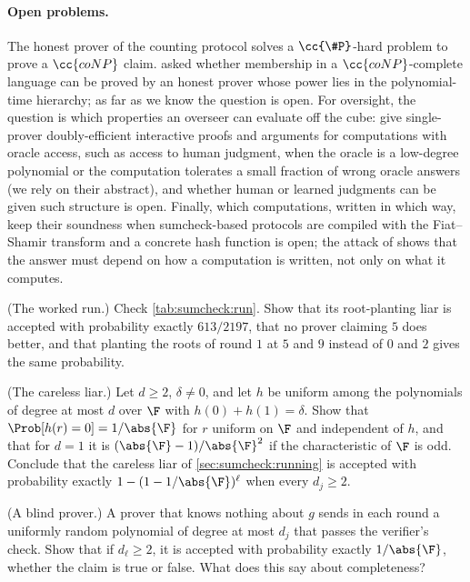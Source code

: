 \begin{refsection}
\paragraph{Open problems.} The honest prover of the counting protocol solves a $\cc{\#P}$-hard problem to prove a $\cc{coNP}$ claim. \Textcite{Babai1990} asked whether membership in a $\cc{coNP}$-complete language can be proved by an honest prover whose power lies in the polynomial-time hierarchy; as far as we know the question is open. For oversight, the question is which properties an overseer can evaluate off the cube: \textcite{ChenKalaiXi2026} give single-prover doubly-efficient interactive proofs and arguments for computations with oracle access, such as access to human judgment, when the oracle is a low-degree polynomial or the computation tolerates a small fraction of wrong oracle answers (we rely on their abstract), and whether human or learned judgments can be given such structure is open. Finally, which computations, written in which way, keep their soundness when sumcheck-based protocols are compiled with the Fiat--Shamir transform and a concrete hash function is open; the attack of \textcite{KhovratovichRothblumSoukhanov2025} shows that the answer must depend on how a computation is written, not only on what it computes.

\begin{exercises}
\item \consolidation (The worked run.) Check \cref{tab:sumcheck:run}. Show that its root-planting liar is accepted with probability exactly $613/2197$, that no prover claiming $5$ does better, and that planting the roots of round $1$ at $5$ and $9$ instead of $0$ and $2$ gives the same probability.\label{ex:sumcheck:run}

\item \consolidation (The careless liar.) Let $d\ge2$, $\delta\ne0$, and let $h$ be uniform among the polynomials of degree at most $d$ over $\F$ with $h(0)+h(1)=\delta$. Show that $\Prob[h(r)=0]=1/\abs{\F}$ for $r$ uniform on $\F$ and independent of $h$, and that for $d=1$ it is $(\abs{\F}-1)/\abs{\F}^2$ if the characteristic of $\F$ is odd. Conclude that the careless liar of \cref{sec:sumcheck:running} is accepted with probability exactly $1-(1-1/\abs{\F})^\ell$ when every $d_j\ge2$. \label{ex:sumcheck:careless}

\item \consolidation (A blind prover.) A prover that knows nothing about $g$ sends in each round a uniformly random polynomial of degree at most $d_j$ that passes the verifier's check. Show that if $d_\ell\ge2$, it is accepted with probability exactly $1/\abs{\F}$, whether the claim is true or false. What does this say about completeness?\label{ex:sumcheck:blind}


\end{exercises}
\end{refsection}
